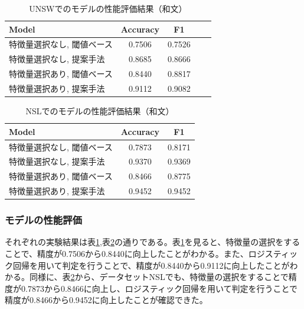 \documentclass{css}
\begin{document}
\begin{table}[ht]
    \caption{UNSWでのモデルの性能評価結果（和文）}
    \centering
    \footnotesize
    \begin{tabular}{lcccc}
        \hline\hline
        Model & Accuracy & F1 \\
        \hline
        特徴量選択なし, 閾値ベース\cite{AbuAlghanam2023-sx} & 0.7506 & 0.7526 \\
        特徴量選択なし, 提案手法 & 0.8685 & 0.8666 \\
        特徴量選択あり, 閾値ベース\cite{AbuAlghanam2023-sx} & 0.8440 & 0.8817 \\
        特徴量選択あり, 提案手法 & 0.9112 & 0.9082 \\
        \hline
    \end{tabular}
    \label{tab:model_performance_UNSW}
\end{table}

\begin{table}[ht]
    \caption{NSLでのモデルの性能評価結果（和文）}
    \centering
    \footnotesize
    \begin{tabular}{lcc}
        \hline\hline
        Model & Accuracy & F1 \\
        \hline
        特徴量選択なし, 閾値ベース\cite{AbuAlghanam2023-sx} & 0.7873 & 0.8171 \\
        特徴量選択なし, 提案手法 & 0.9370 & 0.9369 \\ 
        特徴量選択あり, 閾値ベース\cite{AbuAlghanam2023-sx} & 0.8466 & 0.8775 \\
        特徴量選択あり, 提案手法 & 0.9452 & 0.9452 \\
        \hline
    \end{tabular}
    \label{tab:model_performance_NSL}
\end{table}

\subsubsection{モデルの性能評価}
それぞれの実験結果は表\ref{tab:model_performance_UNSW},表\ref{tab:model_performance_NSL}の通りである。表\ref{tab:model_performance_UNSW}を見ると、特徴量の選択をすることで、精度が0.7506から0.8440に向上したことがわかる。また、ロジスティック回帰を用いて判定を行うことで、精度が0.8440から0.9112に向上したことがわかる。同様に、表\ref{tab:model_performance_NSL}から、データセットNSLでも、特徴量の選択をすることで精度が0.7873から0.8466に向上し、ロジスティック回帰を用いて判定を行うことで精度が0.8466から0.9452に向上したことが確認できた。
\end{document}
